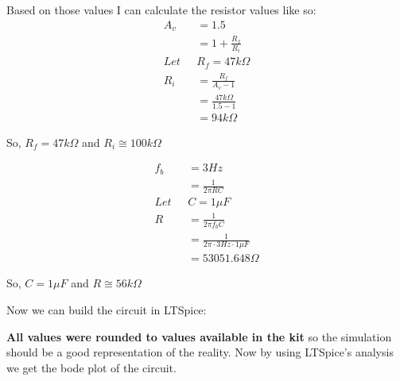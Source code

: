 \documentclass{article}
\begin{document}
Based on those values I can calculate the resistor values like so:
\begin{align}
    A_v &= 1.5 \\
    &= 1 + \frac{R_f}{R_i}\\
    Let\text{ }&R_f = 47k\Omega\\
    R_i &= \frac{R_f}{A_v-1}\\
    &= \frac{47k\Omega}{1.5-1}\\
    &= 94k\Omega
\end{align}
\begin{center}
    So, $\boxed{R_f = 47k\Omega}$ and $\boxed{R_i \cong 100k\Omega}$
\end{center}
\begin{align}
    f_b &= 3Hz \\
    &= \frac{1}{2\pi RC}\\
    Let\text{ }&C = 1\mu F\\
    R &= \frac{1}{2\pi f_bC}\\
    &= \frac{1}{2\pi \cdot3Hz \cdot 1\mu F}\\
    &= 53051.648\Omega
\end{align}
\begin{center}
    So, $\boxed{C = 1\mu F}$ and $\boxed{R\cong 56k\Omega}$
\end{center}
Now we can build the circuit in LTSpice:
\begin{center}
\end{center}
\textbf{All values were rounded to values available in the kit} so the simulation should be a good representation of the reality.
\newpage
Now by using LTSpice's analysis we get the bode plot of the circuit.
\begin{center}
\end{center}
\end{document}
